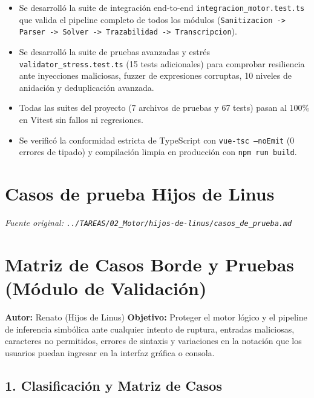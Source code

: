 \documentclass[11pt,a4paper,openany]{book}
\begin{document}
\begin{itemize}[leftmargin=*]
\item Se desarrolló la suite de integración end-to-end \texttt{integracion\_motor.test.ts} que valida el pipeline completo de todos los módulos (\texttt{Sanitizacion -> Parser -> Solver -> Trazabilidad -> Transcripcion}).
\item Se desarrolló la suite de pruebas avanzadas y estrés \texttt{validator\_stress.test.ts} (15 tests adicionales) para comprobar resiliencia ante inyecciones maliciosas, fuzzer de expresiones corruptas, 10 niveles de anidación y deduplicación avanzada.
\item Todas las suites del proyecto (7 archivos de pruebas y 67 tests) pasan al 100\% en Vitest sin fallos ni regresiones.
\item Se verificó la conformidad estricta de TypeScript con \texttt{vue-tsc --noEmit} (0 errores de tipado) y compilación limpia en producción con \texttt{npm run build}.
\end{itemize}


\section{Casos de prueba Hijos de Linus}
\textit{Fuente original: \texttt{../TAREAS/02\_Motor/hijos-de-linus/casos\_de\_prueba.md}}

\section{Matriz de Casos Borde y Pruebas (Módulo de Validación)}

\textbf{Autor:} Renato (Hijos de Linus)
\textbf{Objetivo:} Proteger el motor lógico y el pipeline de inferencia simbólica ante cualquier intento de ruptura, entradas maliciosas, caracteres no permitidos, errores de sintaxis y variaciones en la notación que los usuarios puedan ingresar en la interfaz gráfica o consola.

\hrulefill

\subsection{1. Clasificación y Matriz de Casos}
\end{document}
